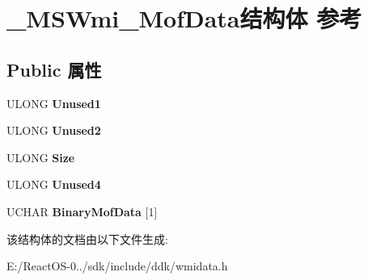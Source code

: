 \hypertarget{struct___m_s_wmi___mof_data}{}\section{\+\_\+\+M\+S\+Wmi\+\_\+\+Mof\+Data结构体 参考}
\label{struct___m_s_wmi___mof_data}
\subsection*{Public 属性}
\begin{DoxyCompactItemize}
\item 
\mbox{\label{struct___m_s_wmi___mof_data_ae418006a4f370d547cff2a8e30d3b45f}} 
U\+L\+O\+NG {\bfseries Unused1}
\item 
\mbox{\label{struct___m_s_wmi___mof_data_a3a810ece9272f78228eb3de331e1ae65}} 
U\+L\+O\+NG {\bfseries Unused2}
\item 
\mbox{\label{struct___m_s_wmi___mof_data_a08d1cb0bee63fc1136532e6be54adc23}} 
U\+L\+O\+NG {\bfseries Size}
\item 
\mbox{\label{struct___m_s_wmi___mof_data_a4f1ad8f706f242f44c9b376fe9dbf0fe}} 
U\+L\+O\+NG {\bfseries Unused4}
\item 
\mbox{\label{struct___m_s_wmi___mof_data_ac40f3d19a68819d5a3ab842c4e61e30d}} 
U\+C\+H\+AR {\bfseries Binary\+Mof\+Data} \mbox{[}1\mbox{]}
\end{DoxyCompactItemize}


该结构体的文档由以下文件生成\+:\begin{DoxyCompactItemize}
\item 
E\+:/\+React\+O\+S-\/0../sdk/include/ddk/wmidata.\+h\end{DoxyCompactItemize}
